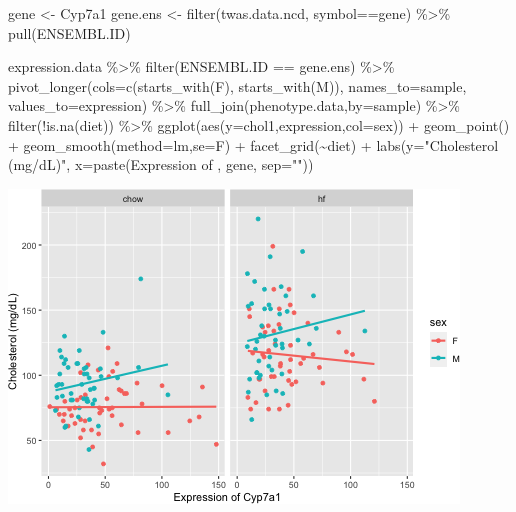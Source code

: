 \documentclass[
]{article}
\newenvironment{Shaded}{\begin{snugshade}}{\end{snugshade}}
\newcommand{\AttributeTok}[1]{\textcolor[rgb]{0.77,0.63,0.00}{#1}}
\newcommand{\FunctionTok}[1]{\textcolor[rgb]{0.00,0.00,0.00}{#1}}
\newcommand{\NormalTok}[1]{#1}
\newcommand{\OtherTok}[1]{\textcolor[rgb]{0.56,0.35,0.01}{#1}}
\newcommand{\SpecialCharTok}[1]{\textcolor[rgb]{0.00,0.00,0.00}{#1}}
\newcommand{\StringTok}[1]{\textcolor[rgb]{0.31,0.60,0.02}{#1}}
\begin{document}
\begin{Shaded}
\begin{Highlighting}[]
\NormalTok{gene }\OtherTok{\textless{}{-}} \StringTok{\textquotesingle{}Cyp7a1\textquotesingle{}}
\NormalTok{gene.ens }\OtherTok{\textless{}{-}} \FunctionTok{filter}\NormalTok{(twas.data.ncd, symbol}\SpecialCharTok{==}\NormalTok{gene) }\SpecialCharTok{\%\textgreater{}\%} \FunctionTok{pull}\NormalTok{(ENSEMBL.ID)}

\NormalTok{expression.data }\SpecialCharTok{\%\textgreater{}\%}
  \FunctionTok{filter}\NormalTok{(ENSEMBL.ID }\SpecialCharTok{==}\NormalTok{ gene.ens) }\SpecialCharTok{\%\textgreater{}\%}
  \FunctionTok{pivot\_longer}\NormalTok{(}\AttributeTok{cols=}\FunctionTok{c}\NormalTok{(}\FunctionTok{starts\_with}\NormalTok{(}\StringTok{\textquotesingle{}F\textquotesingle{}}\NormalTok{),}
                      \FunctionTok{starts\_with}\NormalTok{(}\StringTok{\textquotesingle{}M\textquotesingle{}}\NormalTok{)),}
               \AttributeTok{names\_to=}\StringTok{\textquotesingle{}sample\textquotesingle{}}\NormalTok{,}
               \AttributeTok{values\_to=}\StringTok{\textquotesingle{}expression\textquotesingle{}}\NormalTok{) }\SpecialCharTok{\%\textgreater{}\%}
  \FunctionTok{full\_join}\NormalTok{(phenotype.data,}\AttributeTok{by=}\StringTok{\textquotesingle{}sample\textquotesingle{}}\NormalTok{) }\SpecialCharTok{\%\textgreater{}\%}
  \FunctionTok{filter}\NormalTok{(}\SpecialCharTok{!}\FunctionTok{is.na}\NormalTok{(diet)) }\SpecialCharTok{\%\textgreater{}\%}
  \FunctionTok{ggplot}\NormalTok{(}\FunctionTok{aes}\NormalTok{(}\AttributeTok{y=}\NormalTok{chol1,expression,}\AttributeTok{col=}\NormalTok{sex)) }\SpecialCharTok{+}
  \FunctionTok{geom\_point}\NormalTok{() }\SpecialCharTok{+}
  \FunctionTok{geom\_smooth}\NormalTok{(}\AttributeTok{method=}\StringTok{\textquotesingle{}lm\textquotesingle{}}\NormalTok{,}\AttributeTok{se=}\NormalTok{F) }\SpecialCharTok{+}
  \FunctionTok{facet\_grid}\NormalTok{(}\SpecialCharTok{\textasciitilde{}}\NormalTok{diet) }\SpecialCharTok{+}
  \FunctionTok{labs}\NormalTok{(}\AttributeTok{y=}\StringTok{"Cholesterol (mg/dL)"}\NormalTok{,}
       \AttributeTok{x=}\FunctionTok{paste}\NormalTok{(}\StringTok{\textquotesingle{}Expression of \textquotesingle{}}\NormalTok{, gene, }\AttributeTok{sep=}\StringTok{""}\NormalTok{))}
\end{Highlighting}
\end{Shaded}

\includegraphics{figures/cyp7a1-associations-1.png}
\end{document}
